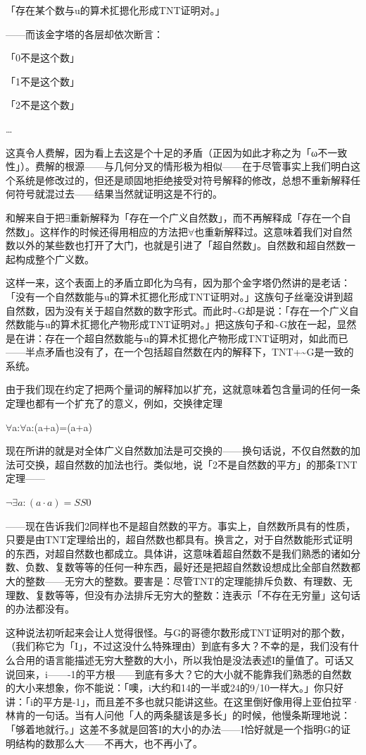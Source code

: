 \documentclass[
  12pt,
  twoside,
  openright,
  oldfontcommands,
]{memoir}
\begin{document}
「存在某个数与u的算术㧟摁化形成TNT证明对。」

------而该金字塔的各层却依次断言：

「0不是这个数」

「1不是这个数」

「2不是这个数」

\ldots

这真令人费解，因为看上去这是个十足的矛盾（正因为如此才称之为「ω不一致性」）。费解的根源------与几何分叉的情形极为相似------在于尽管事实上我们明白这个系统是修改过的，但还是顽固地拒绝接受对符号解释的修改，总想不重新解释任何符号就混过去------结果当然就证明这是不行的。

和解来自于把$\exists$重新解释为「存在一个广义自然数」，而不再解释成「存在一个自然数」。这样作的时候还得用相应的方法把$\forall$也重新解释过。这意味着我们对自然数以外的某些数也打开了大门，也就是引进了「超自然数」。自然数和超自然数一起构成整个广义数。

这样一来，这个表面上的矛盾立即化为乌有，因为那个金字塔仍然讲的是老话：「没有一个自然数能与u的算术㧟摁化形成TNT证明对。」这族句子丝毫没讲到超自然数，因为没有关于超自然数的数字形式。而此时\textasciitilde G却是说：「存在一个广义自然数能与u的算术㧟摁化产物形成TNT证明对。」把这族句子和\textasciitilde G放在一起，显然是在讲：存在一个超自然数能与u的算术㧟摁化产物形成TNT证明对，如此而已------半点矛盾也没有了，在一个包括超自然数在内的解释下，TNT+\textasciitilde G是一致的系统。

由于我们现在约定了把两个量词的解释加以扩充，这就意味着包含量词的任何一条定理也都有一个扩充了的意义，例如，交换律定理

$\forall$a:$\forall$a\textquotesingle:(a+a\textquotesingle)=(a\textquotesingle+a)

现在所讲的就是对全体广义自然数加法是可交换的------换句话说，不仅自然数的加法可交换，超自然数的加法也行。类似地，说「2不是自然数的平方」的那条TNT定理------

$\lnot \exists a:(a\cdot a)=SS0$

------现在告诉我们2同样也不是超自然数的平方。事实上，自然数所具有的性质，只要是由TNT定理给出的，超自然数也都具有。换言之，对于自然数能形式证明的东西，对超自然数也都成立。具体讲，这意味着超自然数不是我们熟悉的诸如分数、负数、复数等等的任何一种东西，最好还是把超自然数设想成比全部自然数都大的整数------无穷大的整数。要害是：尽管TNT的定理能排斥负数、有理数、无理数、复数等等，但没有办法排斥无穷大的整数：连表示「不存在无穷量」这句话的办法都没有。

这种说法初听起来会让人觉得很怪。与G的哥德尔数形成TNT证明对的那个数，（我们称它为「I」，不过这没什么特殊理由）到底有多大？不幸的是，我们没有什么合用的语言能描述无穷大整数的大小，所以我怕是没法表述I的量值了。可话又说回来，i-------1的平方根------到底有多大？它的大小就不能靠我们熟悉的自然数的大小来想象，你不能说：「噢，i大约和14的一半或24的9/10一样大。」你只好讲：「i的平方是-1」，而且差不多也就只能讲这些。在这里倒好像用得上亚伯拉罕·林肯的一句话。当有人问他「人的两条腿该是多长」的时候，他慢条斯理地说：「够着地就行。」这差不多就是回答I的大小的办法------I恰好就是一个指明G的证明结构的数那么大------不再大，也不再小了。
\end{document}

